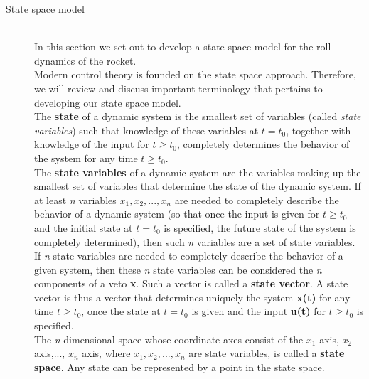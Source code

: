 \documentclass[12pt]{article}
\begin{document}
\begin{description} 
	\item[State space model] \hfill \\
		In this section we set out to develop a state space model for the roll dynamics of the rocket. \\
		
		Modern control theory is founded on the state space approach. Therefore, we will review and discuss important terminology that pertains to developing our state space model. \\
			 
		The \textbf{state} of a dynamic system is the smallest set of variables (called \textit{state variables}) such that knowledge of these variables at $t = t_{0}$, together with knowledge of the input for $ t \geq t_{0}$, completely determines the behavior of the system for any time $t \geq t_{0}$. \cite{MCE}\\
			
		The \textbf{state variables} of a dynamic system are the variables making up the smallest set of variables that determine the state of the dynamic system. If at least \textit{n} variables \textit{$x_{1}, x_{2},..., x_{n}$} are needed to completely describe the behavior of a dynamic system (so that once the input is given for $t \geq t_{0}$ and the initial state at $t = t_{0}$ is specified, the future state of the system is completely determined), then such \textit{n} variables are a set of state variables. \cite{MCE}\\
			
		If \textit{n} state variables are needed to completely describe the behavior of a given system, then these \textit{n} state variables can be considered the \textit{n} components of a veto \textbf{x}. Such a vector is called a \textbf{state vector}. A state vector is thus a vector that determines uniquely the system \textbf{x(t)} for any time $t \geq t_{0}$, once the state at $t = t_{0}$ is given and the input \textbf{u(t)} for $t \geq t_{0}$ is specified. \cite{MCE} \\
			
		The \textit{n}-dimensional space whose coordinate axes consist of the \textit{$x_{1}$} axis, \textit{$x_{2}$} axis,..., \textit{$x_{n}$} axis, where \textit{$x_{1}, x_{2},..., x_{n}$} are state variables, is called a \textbf{state space}. Any state can be represented by a point in the state space. \cite{MCE} \\
			

\end{description}
\end{document}
